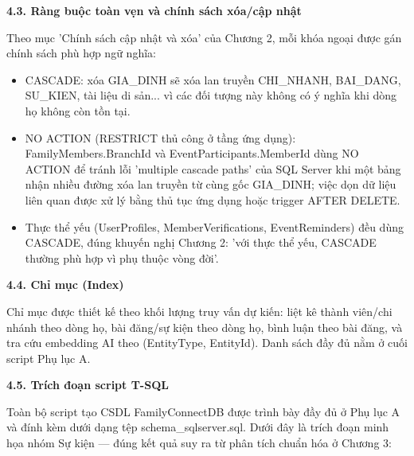 {}
{\Large\bfseries 4.3. Ràng buộc toàn vẹn và chính sách xóa/cập nhật}\par\vspace{0.7em}

Theo mục 'Chính sách cập nhật và xóa' của Chương 2, mỗi khóa ngoại được gán chính sách phù hợp ngữ nghĩa:

\begin{itemize}
\item CASCADE: xóa GIA\_DINH sẽ xóa lan truyền CHI\_NHANH, BAI\_DANG, SU\_KIEN, tài liệu di sản... vì các đối tượng này không có ý nghĩa khi dòng họ không còn tồn tại.
\item NO ACTION (RESTRICT thủ công ở tầng ứng dụng): FamilyMembers.BranchId và EventParticipants.MemberId dùng NO ACTION để tránh lỗi 'multiple cascade paths' của SQL Server khi một bảng nhận nhiều đường xóa lan truyền từ cùng gốc GIA\_DINH; việc dọn dữ liệu liên quan được xử lý bằng thủ tục ứng dụng hoặc trigger AFTER DELETE.
\item Thực thể yếu (UserProfiles, MemberVerifications, EventReminders) đều dùng CASCADE, đúng khuyến nghị Chương 2: 'với thực thể yếu, CASCADE thường phù hợp vì phụ thuộc vòng đời'.
\end{itemize}

{}
{\Large\bfseries 4.4. Chỉ mục (Index)}\par\vspace{0.7em}

Chỉ mục được thiết kế theo khối lượng truy vấn dự kiến: liệt kê thành viên/chi nhánh theo dòng họ, bài đăng/sự kiện theo dòng họ, bình luận theo bài đăng, và tra cứu embedding AI theo (EntityType, EntityId). Danh sách đầy đủ nằm ở cuối script Phụ lục A.

{}
{\Large\bfseries 4.5. Trích đoạn script T-SQL}\par\vspace{0.7em}

Toàn bộ script tạo CSDL FamilyConnectDB được trình bày đầy đủ ở Phụ lục A và đính kèm dưới dạng tệp schema\_sqlserver.sql. Dưới đây là trích đoạn minh họa nhóm Sự kiện — đúng kết quả suy ra từ phân tích chuẩn hóa ở Chương 3:

